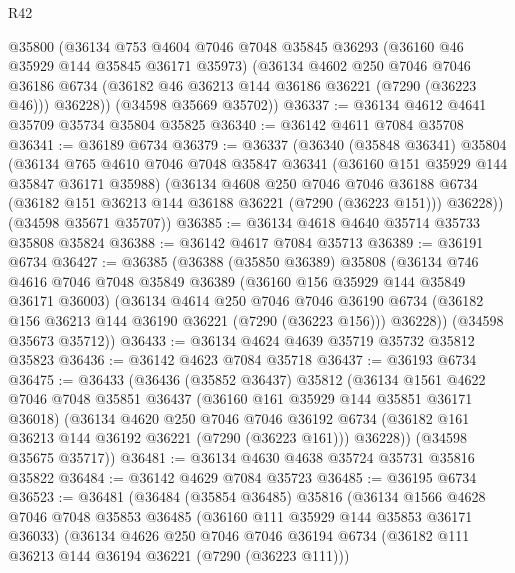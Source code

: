 \begin{lexlean}{R42}
\begin{coremodule}
{      @35800
      (@36134
        @753
        @4604
        @7046
        @7048
        @35845
        @36293
        (@36160 @46 @35929 @144 @35845 @36171 @35973)
        (@36134
          @4602
          @250
          @7046
          @7046
          @36186
          @6734
          (@36182 @46 @36213 @144 @36186 @36221 (@7290 (@36223 @46)))
          @36228))
      (@34598 @35669 @35702))
@36337 := @36134 @4612 @4641 @35709 @35734 @35804 @35825
@36340 := @36142 @4611 @7084 @35708
@36341 := @36189 @6734
@36379 := @36337
    (@36340
      (@35848 @36341)
      @35804
      (@36134
        @765
        @4610
        @7046
        @7048
        @35847
        @36341
        (@36160 @151 @35929 @144 @35847 @36171 @35988)
        (@36134
          @4608
          @250
          @7046
          @7046
          @36188
          @6734
          (@36182 @151 @36213 @144 @36188 @36221 (@7290 (@36223 @151)))
          @36228))
      (@34598 @35671 @35707))
@36385 := @36134 @4618 @4640 @35714 @35733 @35808 @35824
@36388 := @36142 @4617 @7084 @35713
@36389 := @36191 @6734
@36427 := @36385
    (@36388
      (@35850 @36389)
      @35808
      (@36134
        @746
        @4616
        @7046
        @7048
        @35849
        @36389
        (@36160 @156 @35929 @144 @35849 @36171 @36003)
        (@36134
          @4614
          @250
          @7046
          @7046
          @36190
          @6734
          (@36182 @156 @36213 @144 @36190 @36221 (@7290 (@36223 @156)))
          @36228))
      (@34598 @35673 @35712))
@36433 := @36134 @4624 @4639 @35719 @35732 @35812 @35823
@36436 := @36142 @4623 @7084 @35718
@36437 := @36193 @6734
@36475 := @36433
    (@36436
      (@35852 @36437)
      @35812
      (@36134
        @1561
        @4622
        @7046
        @7048
        @35851
        @36437
        (@36160 @161 @35929 @144 @35851 @36171 @36018)
        (@36134
          @4620
          @250
          @7046
          @7046
          @36192
          @6734
          (@36182 @161 @36213 @144 @36192 @36221 (@7290 (@36223 @161)))
          @36228))
      (@34598 @35675 @35717))
@36481 := @36134 @4630 @4638 @35724 @35731 @35816 @35822
@36484 := @36142 @4629 @7084 @35723
@36485 := @36195 @6734
@36523 := @36481
    (@36484
      (@35854 @36485)
      @35816
      (@36134
        @1566
        @4628
        @7046
        @7048
        @35853
        @36485
        (@36160 @111 @35929 @144 @35853 @36171 @36033)
        (@36134
          @4626
          @250
          @7046
          @7046
          @36194
          @6734
          (@36182 @111 @36213 @144 @36194 @36221 (@7290 (@36223 @111)))
}
\end{coremodule}
\end{lexlean}

